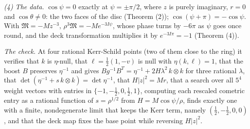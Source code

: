 \emph{(4) The data.} $\cos\psi = 0$ exactly at $\psi = \pm\pi/2$, where $z$ is purely imaginary, $r = 0$ and $\cos\theta \neq 0$: the two faces of the disc (Theorem (2)); $\cos(\psi + \pi) = -\cos\psi$. With $\mathfrak M = -Mz^{-3}$, $\rho^3\mathfrak M = -Me^{-3I\psi}$, whose phase turns by $-6\pi$ as $\psi$ goes once round, and the deck transformation multiplies it by $e^{-3I\pi} = -1$ (Theorem (4)).

\emph{The check.} At four rational Kerr-Schild points (two of them close to the ring) it verifies that $k$ is $\eta$-null, that $\ell = \tfrac12(1, -v)$ is null with $\eta(k,\ell) = 1$, that the boost $B$ preserves $\eta^{-1}$ and gives $Bg^{-1}B^{T} = \eta^{-1} + 2H\lambda^2\,k\otimes k$ for three rational $\lambda$, that $\det(\eta^{-1} + s\,k\otimes k) = \det\eta^{-1}$, that $H|z|^2 = Mr$, that a search over all $5^4$ weight vectors with entries in $\{-1, -\tfrac12, 0, \tfrac12, 1\}$, computing each rescaled cometric entry as a rational function of $s = \rho^{1/2}$ from $H = M\cos\psi/\rho$, finds exactly one with a finite, nondegenerate limit that keeps the Kerr term, namely $(\tfrac12, -\tfrac12, 0, 0)$, and that the deck map fixes the base point while reversing $H|z|^2$.
